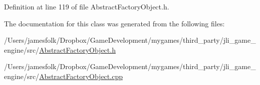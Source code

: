 Definition at line 119 of file Abstract\+Factory\+Object.\+h.



The documentation for this class was generated from the following files\+:\begin{DoxyCompactItemize}
\item 
/\+Users/jamesfolk/\+Dropbox/\+Game\+Development/mygames/third\+\_\+party/jli\+\_\+game\+\_\+engine/src/\hyperlink{_abstract_factory_object_8h}{Abstract\+Factory\+Object.\+h}\item 
/\+Users/jamesfolk/\+Dropbox/\+Game\+Development/mygames/third\+\_\+party/jli\+\_\+game\+\_\+engine/src/\hyperlink{_abstract_factory_object_8cpp}{Abstract\+Factory\+Object.\+cpp}\end{DoxyCompactItemize}
